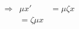 \documentclass[preview]{standalone}
\begin{document}
\begin{align*}
\Rightarrow & \mu x' & = \mu \zeta x \\& = \zeta \mu x
\end{align*}
\end{document}
